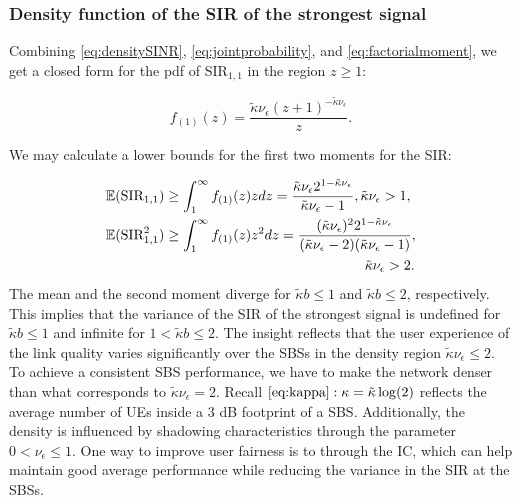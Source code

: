 \documentclass[lettersize,journal]{IEEEtran}
\begin{document}
\subsubsection{Density function of the SIR of the strongest signal}
Combining \eqref{eq:densitySINR}, \eqref{eq:jointprobability}, and \eqref{eq:factorialmoment}, we get a closed form for the pdf of SIR$_{1,1}$ in the region $z\geq 1$:


\begin{equation}
  \label{eq:SIR1}
  f_{(1)}(z) = \frac {\tilde{\kappa}\nu_{\epsilon}\left({z + 1} \right)^{-\tilde{\kappa}\nu_{\epsilon}}} {z}.
\end{equation}



We may calculate a lower bounds for the first two moments for the SIR:


\begin{align}
  &\mathbb{E}(\text{SIR}_{1,1})  \geq\int_{1}^{\infty}f_{(1)}(z)zdz=\frac{\tilde{\kappa}\nu_{\epsilon}2^{1-\tilde{\kappa}\nu_{\epsilon} }}{\tilde{\kappa}\nu_{\epsilon}-1}, \tilde{\kappa}\nu_{\epsilon} >1, \\
  &\mathbb{E}(\text{SIR}^2_{1,1}) \geq \int_{1}^{\infty}f_{(1)}(z)z^2dz = \frac{(\tilde{\kappa}\nu_{\epsilon}) ^2 2^{1-\tilde{\kappa}\nu_{\epsilon} }}{(\tilde{\kappa}\nu_{\epsilon} - 2)  (\tilde{\kappa}\nu_{\epsilon} - 1)}, \nonumber\\
  &\hspace{6.5cm}\tilde{\kappa}\nu_{\epsilon}>2 .
\end{align}
The mean and the second moment diverge for $\tilde{\kappa}b\leq 1$ and $\tilde{\kappa}b\leq 2$, respectively. This implies that the variance of the SIR of the strongest signal is undefined for $\tilde{\kappa}b \leq 1$ and infinite for $1 <\tilde{\kappa}b \leq 2$. The insight reflects that the user experience of the link quality varies significantly over the SBSs in the density region $\tilde{\kappa} \nu_{\epsilon} \leq 2$. To achieve a consistent SBS performance, we have to make the network denser than what corresponds to $\tilde{\kappa} \nu_{\epsilon} =2$. Recall $\eqref{eq:kappa}: \kappa = \tilde{\kappa}\log(2)$ reflects the average number of UEs inside a $3$ dB footprint of a SBS.  Additionally, the density is influenced by shadowing characteristics through the parameter  $0<\nu_{\epsilon} \leq 1$. One way to improve user fairness is to through the IC, which can help maintain good average performance while reducing the variance in the SIR at the SBSs.
\end{document}
